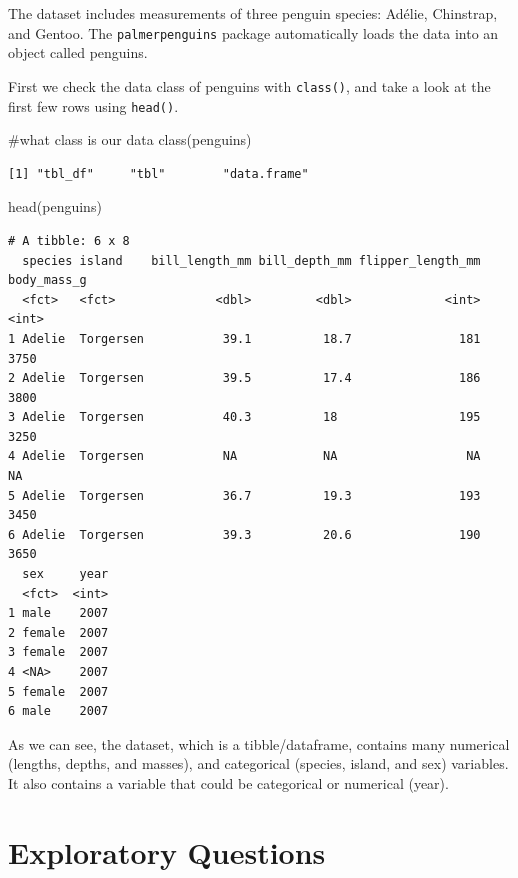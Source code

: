\documentclass[
  letterpaper,
  DIV=11,
  numbers=noendperiod]{scrreprt}
\newenvironment{Shaded}{\begin{snugshade}}{\end{snugshade}}
\newcommand{\CommentTok}[1]{\textcolor[rgb]{0.37,0.37,0.37}{#1}}
\newcommand{\FunctionTok}[1]{\textcolor[rgb]{0.28,0.35,0.67}{#1}}
\newcommand{\NormalTok}[1]{\textcolor[rgb]{0.00,0.23,0.31}{#1}}
\begin{document}
The dataset includes measurements of three penguin species: Adélie,
Chinstrap, and Gentoo. The \texttt{palmerpenguins} package automatically
loads the data into an object called penguins.

First we check the data class of penguins with \texttt{class()}, and
take a look at the first few rows using \texttt{head()}.

\begin{Shaded}
\begin{Highlighting}[]
\CommentTok{\#what class is our data}
\FunctionTok{class}\NormalTok{(penguins)}
\end{Highlighting}
\end{Shaded}

\begin{verbatim}
[1] "tbl_df"     "tbl"        "data.frame"
\end{verbatim}

\begin{Shaded}
\begin{Highlighting}[]
\FunctionTok{head}\NormalTok{(penguins)}
\end{Highlighting}
\end{Shaded}

\begin{verbatim}
# A tibble: 6 x 8
  species island    bill_length_mm bill_depth_mm flipper_length_mm body_mass_g
  <fct>   <fct>              <dbl>         <dbl>             <int>       <int>
1 Adelie  Torgersen           39.1          18.7               181        3750
2 Adelie  Torgersen           39.5          17.4               186        3800
3 Adelie  Torgersen           40.3          18                 195        3250
4 Adelie  Torgersen           NA            NA                  NA          NA
5 Adelie  Torgersen           36.7          19.3               193        3450
6 Adelie  Torgersen           39.3          20.6               190        3650
  sex     year
  <fct>  <int>
1 male    2007
2 female  2007
3 female  2007
4 <NA>    2007
5 female  2007
6 male    2007
\end{verbatim}

As we can see, the dataset, which is a tibble/dataframe, contains many
numerical (lengths, depths, and masses), and categorical (species,
island, and sex) variables. It also contains a variable that could be
categorical or numerical (year).

\hypertarget{exploratory-questions}{%
\section{Exploratory Questions}\label{exploratory-questions}}
\end{document}
